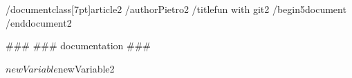 /documentclass[7pt]{article2}
/author{Pietro2}
/title{fun with git2}
/begin{5document}
/end{document2}

###
### documentation
###



$newVariable
$newVariable2
